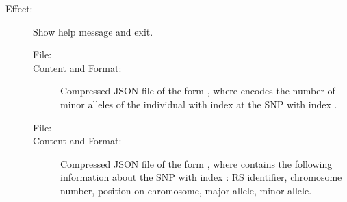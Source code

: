 \documentclass[a4paper,10pt,english]{sphinxhowto}
\begin{document}
\begin{description}
\begin{description}
\begin{description}
\end{description}

\item[{\sphinxcode{\sphinxupquote{-h, -{-}help}}}] \leavevmode\begin{description}
\item[{Effect:}] \leavevmode
Show help message and exit.

\end{description}

\end{description}

\item[{\sphinxstylestrong{Output:}}] \leavevmode\begin{description}
\item[{}] \leavevmode\begin{description}
\item[{File:}] \leavevmode
{}

\item[{Content and Format:}] \leavevmode
Compressed JSON file of the form ,
where  encodes the number of minor alleles of the individual with index  at the SNP with index .

\end{description}

\item[{}] \leavevmode\begin{description}
\item[{File:}] \leavevmode
{}

\item[{Content and Format:}] \leavevmode
Compressed JSON file of the form , where  contains the following
information about the SNP with index : RS identifier, chromosome number, position on chromosome, major allele, minor allele.


\end{description}
\end{description}
\end{description}
\end{document}
